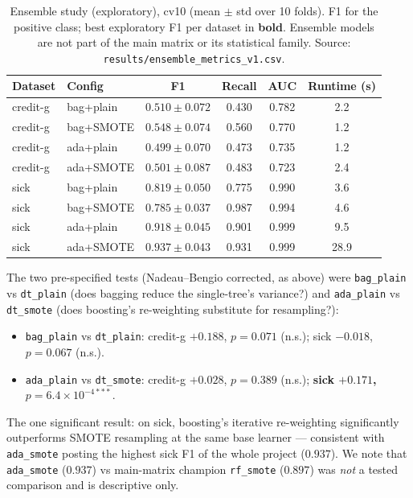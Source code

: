 \begin{table}[H]
\centering
\caption{Ensemble study (exploratory), cv10 (mean $\pm$ std over 10 folds). F1 for the positive class; best exploratory F1 per dataset in \textbf{bold}. Ensemble models are not part of the main matrix or its statistical family. Source: \texttt{results/ensemble\_metrics\_v1.csv}.}
\label{tab:ensemble}
\begin{tabular}{llcccc}
\toprule
Dataset & Config & F1 & Recall & AUC & Runtime (s) \\
\midrule
credit-g & bag+plain & $0.510\pm0.072$ & 0.430 & 0.782 & 2.2 \\
credit-g & bag+SMOTE & $0.548\pm0.074$ & 0.560 & 0.770 & 1.2 \\
credit-g & ada+plain & $0.499\pm0.070$ & 0.473 & 0.735 & 1.2 \\
credit-g & ada+SMOTE & $0.501\pm0.087$ & 0.483 & 0.723 & 2.4 \\
\midrule
sick & bag+plain & $0.819\pm0.050$ & 0.775 & 0.990 & 3.6 \\
sick & bag+SMOTE & $0.785\pm0.037$ & 0.987 & 0.994 & 4.6 \\
sick & ada+plain & $0.918\pm0.045$ & 0.901 & 0.999 & 9.5 \\
sick & ada+SMOTE & $\mathbf{0.937\pm0.043}$ & 0.931 & 0.999 & 28.9 \\
\bottomrule
\end{tabular}
\end{table}

The two pre-specified tests (Nadeau--Bengio corrected, as above) were \texttt{bag\_plain} vs \texttt{dt\_plain} (does bagging reduce the single-tree's variance?) and \texttt{ada\_plain} vs \texttt{dt\_smote} (does boosting's re-weighting substitute for resampling?):

\begin{itemize}
  \item \texttt{bag\_plain} vs \texttt{dt\_plain}: credit-g $+0.188$, $p=0.071$ (n.s.); sick $-0.018$, $p=0.067$ (n.s.).
  \item \texttt{ada\_plain} vs \texttt{dt\_smote}: credit-g $+0.028$, $p=0.389$ (n.s.); \textbf{sick $+0.171$, $p=6.4\times10^{-4***}$}.
\end{itemize}

The one significant result: on sick, boosting's iterative re-weighting significantly outperforms SMOTE resampling at the same base learner --- consistent with \texttt{ada\_smote} posting the highest sick F1 of the whole project ($0.937$). We note that \texttt{ada\_smote} ($0.937$) vs main-matrix champion \texttt{rf\_smote} ($0.897$) was \emph{not} a tested comparison and is descriptive only.

